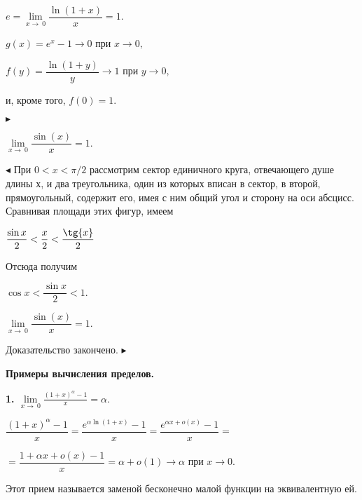 \begin{center}
$ e=\lim\limits_{x\to\ 0} \dfrac{\ln(1+x)}{x} = 1.$
\end{center}


\begin{center}
$ g(x)=e^{x}-1 \rightarrow 0 $ при $x \rightarrow 0,$

$ f(y)=\dfrac{\ln(1+y)}{y} \rightarrow 1 $ при $y \rightarrow 0,$
\end{center}
и, кроме того, $f(0)=1.$


  $\blacktriangleright$

\begin{approval}
$ \lim\limits_{x\to\ 0} \dfrac{\sin(x)}{x} = 1.$
\end{approval}
$\blacktriangleleft$ При $0<x<\pi /2$ рассмотрим сектор единичного круга, отвечающего душе длины $х$, и два треугольника, один из которых вписан в сектор, в второй, прямоугольный, содержит его, имея с ним общий угол и сторону на оси абсцисс. Сравнивая площади этих фигур, имеем
\begin{center}
$\dfrac {\sin{x}}{2}<\dfrac {x}{2}<\dfrac {\tg{x}}{2}$
\end{center}
Отсюда получим
\begin{center}
$\cos{x}<\dfrac {\sin{x}}{2}<1.$
\end{center}


\begin{center}
$\lim\limits_{x\to\ 0} \dfrac{\sin(x)}{x} = 1.$
\end{center}
Доказательство закончено.  $\blacktriangleright$

\bf{Примеры вычисления пределов.}

\bf{1.} \rm $\lim\limits_{x\to\ 0} \frac{(1+x)^{\alpha}-1}{x} = \alpha.$

\begin{center}
$ \dfrac{(1+x)^{\alpha}-1}{x}  =  \dfrac{e^{\alpha\ln(1+x)}-1}{x} = \dfrac{e^{\alpha x+o(x)}-1}{x}=$

 $= \dfrac{1+\alpha x + o(x)-1}{x} = \alpha+o(1) \rightarrow \alpha$ при $x \rightarrow 0.$

\end{center}
Этот прием называется заменой бесконечно малой функции на эквивалентную ей.



